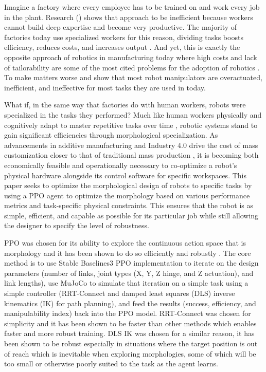 \documentclass[letterpaper, 10 pt, conference]{ieeeconf}  %
\begin{document}
Imagine a factory where every employee has to be trained on and work every job in the plant.
Research (\cite{staats2012specialization}\cite{madiedo2020capturing}) shows that approach to be inefficient because workers cannot build deep expertise and become very productive.
The majority of factories today use specialized workers for this reason, dividing tasks boosts efficiency, reduces costs, and increases output \cite{jackson2025story}\cite{indeed2025pros}. 
And yet, this is exactly the opposite approach of robotics in manufacturing today where high costs and lack of tailorability are some of the most cited problems for the adoption of robotics \cite{mckinsey2019industrial}\cite{patel2024}.
To make matters worse \cite{russo2021task} and \cite{he2019underactuated} show that most robot manipulators are overactuated, inefficient, and ineffective for most tasks they are used in today.

What if, in the same way that factories do with human workers, robots were specialized in the tasks they performed?
Much like human workers physically and cognitively adapt to master repetitive tasks over time \cite{arany2008pgc1}\cite{mancuso2022effect}\cite{wu2020occupational}, robotic systems stand to gain significant efficiencies through morphological specialization. 
As advancements in additive manufacturing and Industry 4.0 drive the cost of mass customization closer to that of traditional mass production \cite{wang2017industry}\cite{baumers2019economics}, it is becoming both economically feasible and operationally necessary to co-optimize a robot's physical hardware alongside its control software for specific workspaces.
This paper seeks to optimize the morphological design of robots to specific tasks by using a PPO agent to optimize the morphology based on various performance metrics and task-specific physical constraints.
This ensures that the robot is as simple, efficient, and capable as possible for its particular job while still allowing the designer to specify the level of robustness.

PPO was chosen for its ability to explore the continuous action space that is morphology and it has been shown to do so efficiently and robustly \cite{schulman2017proximal}.
The core method is to use Stable Baselines3 PPO implementation to iterate on the design parameters (number of links, joint types (X, Y, Z hinge, and Z actuation), and link lengths), use MuJoCo to simulate that iteration on a simple task using a simple controller (RRT-Connect and damped least squares (DLS) inverse kinematics (IK) for path planning), and feed the results (success, efficiency, and manipulability index) back into the PPO model.
RRT-Connect was chosen for simplicity and it has been shown to be faster than other methods \cite{kuffner2000rrt} which enables faster and more robust training.
DLS IK was chosen for a similar reason, it has been shown to be robust especially in situations where the target position is out of reach \cite{buss2004introduction} which is inevitable when exploring morphologies, some of which will be too small or otherwise poorly suited to the task as the agent learns.
\end{document}
